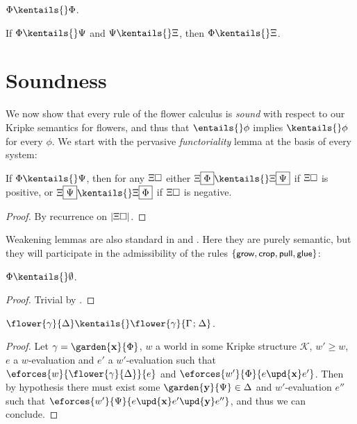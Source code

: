 \begin{fact}[Reflexivity]
  $\Phi \kentails{}\Phi$.
\end{fact}

\begin{fact}[Transitivity]
  If $\Phi \kentails{}\Psi$ and $\Psi \kentails{}\Xi$, then $\Phi \kentails{}\Xi$.
\end{fact}


\section{Soundness}

We now show that every rule of the flower calculus is \emph{sound} with respect
to our Kripke semantics for flowers, and thus that $\entails{} \phi$ implies
$\kentails{}\phi$ for every $\phi$. We start with the pervasive
\emph{functoriality} lemma at the basis of every 
system:

\begin{lemma}[Functoriality] If $\Phi \kentails{}
  \Psi$, then for any $\Xi\square$ either $\Xi\select{\Phi} \kentails{}
  \Xi\select{\Psi}$ if $\Xi\square$ is positive, or $\Xi\select{\Psi} \kentails{}
  \Xi\select{\Phi}$ if $\Xi\square$ is negative.
\end{lemma}
\begin{proof}
  By recurrence on $\left|\Xi\square\right|$.
\end{proof}

Weakening lemmas are also standard in  and . Here they
are purely semantic, but they will participate in the admissibility of the
 rules $\{\text{\small$\mathsf{grow}$},\text{\small$\mathsf{crop}$},\text{\small$\mathsf{pull}$},\text{\small$\mathsf{glue}$}\}$:

\begin{lemma}[Weakening]
  $\Phi \kentails{}\emptyset$.
\end{lemma}
\begin{proof}
  Trivial by .
\end{proof}

\begin{lemma}[Co-weakening]
  $\flower{\gamma}{\Delta} \kentails{}\flower{\gamma}{\Gamma \sep \Delta}$.
\end{lemma}
\begin{proof}
  Let $\gamma = \garden{\bx}{\Phi}$, $w$ a world in some Kripke structure
  $\mathcal{K}$, $w' \geq w$, $e$ a $w$-evaluation and $e'$ a $w'$-evaluation
  such that $\eforces{w}{\flower{\gamma}{\Delta}}{e}$ and $\eforces{w'}{\Phi}{e
  \upd{\bx} e'}$. Then by hypothesis there must exist some $\garden{\by}{\Psi}
  \in \Delta$ and $w'$-evaluation $e''$ such that $\eforces{w'}{\Psi}{e
  \upd{\bx} e' \upd{\by} e''}$, and thus we can conclude.
\end{proof}

